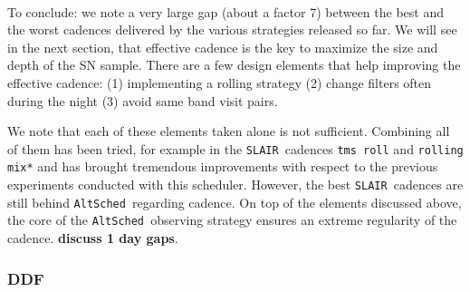 \documentclass [11pt,a4paper]{article}
\newcommand{\FixMe}[1]{{\color{red} \bf \large #1}}
\newcommand{\slair}{{\tt SLAIR\ }}
\newcommand{\altsched}{{\tt AltSched\ }}
\begin{document}
\paragraph{} To conclude: we note a very large gap (about a factor 7) between
the best and the worst cadences delivered by the various strategies
released so far.  We will see in the next section, that effective
cadence is the key to maximize the size and depth of the SN sample.
There are a few design elements that help improving the effective
cadence: (1) implementing a rolling strategy (2) change filters often
during the night (3) avoid same band visit pairs.

We note that each of these elements taken alone is not
sufficient. Combining all of them has been tried, for example in the
\slair cadences {\tt tms\ roll} and {\tt rolling mix*} and has brought
tremendous improvements with respect to the previous experiments
conducted with this scheduler.  However, the best \slair cadences are
still behind \altsched regarding cadence.  On top of the elements
discussed above, the core of the \altsched observing strategy ensures
an extreme regularity of the cadence. \FixMe{discuss 1 day gaps}. 



\subsubsection{DDF}
\end{document}
